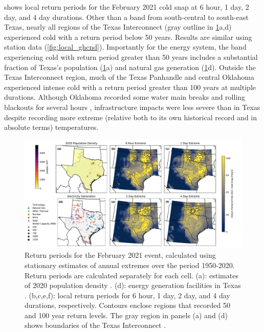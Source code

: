 \documentclass[12pt]{iopart}
\begin{document}
 shows local return periods for the February 2021 cold snap at 6 hour, 1 day, 2 day, and 4 day durations.
Other than a band from south-central to south-east Texas, nearly all regions of the Texas Interconnect (gray outline in \cref{fig:local_era5}a,d) experienced cold with a return period below 50 years.
Results are similar using station data (\cref{fig:local_ghcnd}).
Importantly for the energy system, the band experiencing cold with return period greater than 50 years includes a substantial fraction of Texas’s population (\cref{fig:local_era5}a) and natural gas generation (\cref{fig:local_era5}d).
Outside the Texas Interconnect region, much of the Texas Panhandle and central Oklahoma experienced intense cold with a return period greater than 100 years at multiple durations.
Although Oklahoma recorded some water main breaks \cite{crum_water:2021} and rolling blackouts for several hours \cite{money_oklahoma:2021}, infrastructure impacts were less severe than in Texas despite recording more extreme (relative both to its own historical record and in absolute terms) temperatures.

\begin{figure}
  \centering
  \includegraphics[width=\textwidth]{local_rt_era5.pdf}
  \caption{
    Return periods for the February 2021 event, calculated using stationary estimates of annual extremes over the period 1950-2020.
    Return periods are calculated separately for each cell.
    (a): estimates of 2020 population density \cite{ciesin_gpwv4:2016}.
    (d): energy generation facilities in Texas \cite{useia_generators:2021}.
    (b,c,e,f): local return periods for 6 hour, 1 day, 2 day, and 4 day durations, respectively.
    Contours enclose regions that recorded 50 and 100 year return levels.
    The gray region in panels (a) and (d) shows boundaries of the Texas Interconnect \cite{useia_regions:2021}.
  }\label{fig:local_era5}
\end{figure}
\end{document}
